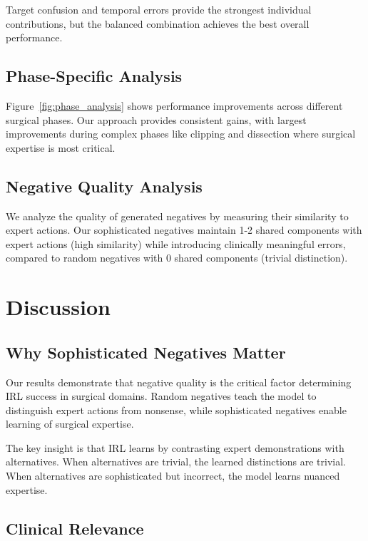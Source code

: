 \documentclass[runningheads]{llncs}
\begin{document}
Target confusion and temporal errors provide the strongest individual contributions, but the balanced combination achieves the best overall performance.

\subsection{Phase-Specific Analysis}

Figure~\ref{fig:phase_analysis} shows performance improvements across different surgical phases. Our approach provides consistent gains, with largest improvements during complex phases like clipping and dissection where surgical expertise is most critical.

\subsection{Negative Quality Analysis}

We analyze the quality of generated negatives by measuring their similarity to expert actions. Our sophisticated negatives maintain 1-2 shared components with expert actions (high similarity) while introducing clinically meaningful errors, compared to random negatives with 0 shared components (trivial distinction).

\section{Discussion}

\subsection{Why Sophisticated Negatives Matter}

Our results demonstrate that negative quality is the critical factor determining IRL success in surgical domains. Random negatives teach the model to distinguish expert actions from nonsense, while sophisticated negatives enable learning of surgical expertise.

The key insight is that IRL learns by contrasting expert demonstrations with alternatives. When alternatives are trivial, the learned distinctions are trivial. When alternatives are sophisticated but incorrect, the model learns nuanced expertise.

\subsection{Clinical Relevance}
\end{document}
